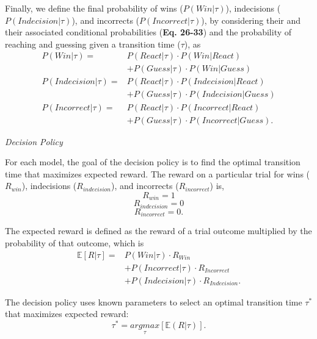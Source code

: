 \documentclass[man,floatsintext,letterpaper,12pt]{apa7}
\newcommand\boldblue[1]{\textcolor{mydarkblue}{\textbf{#1}}}
\begin{document}
Finally, we define the final probability of wins ($P(Win|\tau)$), indecisions ($P(Indecision|\tau)$), and incorrects ($P(Incorrect|\tau)$), by considering their and their associated conditional probabilities (\boldblue{Eq. 26-33}) and the probability of reaching and guessing given a transition time ($\tau$), as
\begin{align}
    P(Win|\tau)        = & P(React|\tau) \cdot P(Win|React) \nonumber        \\ &+  P(Guess|\tau) \cdot P(Win|Guess)\\
    P(Indecision|\tau) = & P(React|\tau) \cdot P(Indecision|React) \nonumber \\ &+ P(Guess|\tau) \cdot P(Indecision|Guess) \\
    P(Incorrect|\tau)  = & P(React|\tau) \cdot P(Incorrect|React) \nonumber  \\ &+ P(Guess|\tau) \cdot P(Incorrect|Guess).
\end{align}

\vspace{2mm}
\noindent\emph{Decision Policy}

\noindent For each model, the goal of the decision policy is to find the optimal transition time that maximizes expected reward. The reward on a particular trial for wins ($R_{win}$), indecisions ($R_{indecision}$), and incorrects ($R_{incorrect}$) is,
\begin{equation}
    R_{win} = 1
\end{equation}
\begin{equation}
    R_{indecision} = 0
\end{equation}
\begin{equation}
    R_{incorrect} = 0.
\end{equation}

The expected reward is defined as the reward of a trial outcome multiplied by the probability of that outcome, which is
%
\begin{align}
    \mathbb{E}[R|\tau] = & P(Win|\tau) \cdot R_{Win} \nonumber \\ &+ P(Incorrect|\tau) \cdot R_{Incorrect} \nonumber \\ &+ P(Indecision|\tau) \cdot R_{Indecision}.
\end{align}

The decision policy uses known parameters to select an optimal transition time $\tau^*$ that maximizes expected reward:
\begin{equation}
    \tau^* = \underset{\tau}{argmax}[\mathbb{E}(R|\tau)].
\end{equation}
\end{document}
